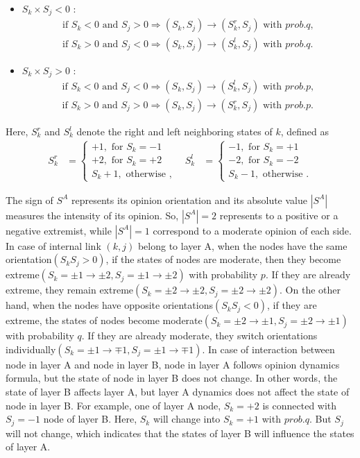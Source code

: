 \documentclass[english]{cccconf}
\begin{document}
\begin{itemize}
\item $S_k \times S_j < 0$ :
\begin{align*}
\mbox{if } S_k<0 \mbox{ and } S_j>0  \Rightarrow (S_k, S_j) \rightarrow (S_k^r, S_j) \mbox{ with } prob.q,\\
\mbox{if } S_k>0 \mbox{ and } S_j<0  \Rightarrow (S_k, S_j) \rightarrow (S_k^l, S_j) \mbox{ with } prob.q.
\end{align*}
\item $S_k \times S_j > 0$ :
\begin{align*}
\mbox{if } S_k<0 \mbox{ and } S_j<0  \Rightarrow (S_k, S_j) \rightarrow (S_k^l, S_j) \mbox{ with } prob.p,\\
\mbox{if } S_k>0 \mbox{ and } S_j>0  \Rightarrow (S_k, S_j) \rightarrow (S_k^r, S_j) \mbox{ with } prob.p.
\end{align*}
\end{itemize}
Here, $S_k^r$ and $S_k^l$ denote the right and left neighboring states of $k$, defined as
\begin{align*}
S_k^r &= \left\{\begin{matrix}
+1,\mbox{ for } S_k = -1\\
+2,\mbox{ for } S_k = +2\\ 
S_k + 1,\mbox{ otherwise }, 
\end{matrix}\right. &
S_k^l &= \left\{\begin{matrix}
-1,\mbox{ for } S_k= +1
\\ -2,\mbox{ for } S_k=-2
\\ S_k - 1,\mbox{ otherwise }.
\end{matrix}\right.
\end{align*}


The sign of $S^A$ represents its opinion orientation and its absolute value $|S^A|$ measures the intensity of its opinion. So, $|S^A|=2$ represents to a positive or a negative extremist, while  $|S^A|=1$ correspond to a moderate opinion of each side. In case of internal link $(k, j)$ belong to layer A, when the nodes have the same orientation$(S_kS_j>0)$, if the states of nodes are moderate, then they become extreme$(S_k=\pm1 \rightarrow \pm2, S_j= \pm1 \rightarrow \pm2)$ with probability $p$. If they are already extreme, they remain extreme$(S_k=\pm2 \rightarrow \pm2, S_j= \pm2 \rightarrow \pm2)$. On the other hand, when the nodes have opposite orientations$(S_kS_j<0)$, if they are extreme, the states of nodes become moderate$(S_k=\pm2 \rightarrow \pm1, S_j= \pm2 \rightarrow \pm1)$ with probability $q$. If they are already moderate, they switch orientations individually$(S_k=\pm1 \rightarrow \mp1, S_j= \pm1 \rightarrow \mp1)$.  In case of interaction between node in layer A and node in layer B, node in layer A follows opinion dynamics formula, but the state of node in layer B does not change. In other words, the state of layer B affects layer A, but layer A dynamics does not affect the state of node in layer B. For example, one of layer A node, $S_k = +2$ is connected with  $S_j = -1$ node of layer B. Here, $S_k$ will change into $S_k = +1$ with $prob.q$. But $S_j$ will not change, which indicates that the states of layer B will influence the states of layer A.
\end{document}
